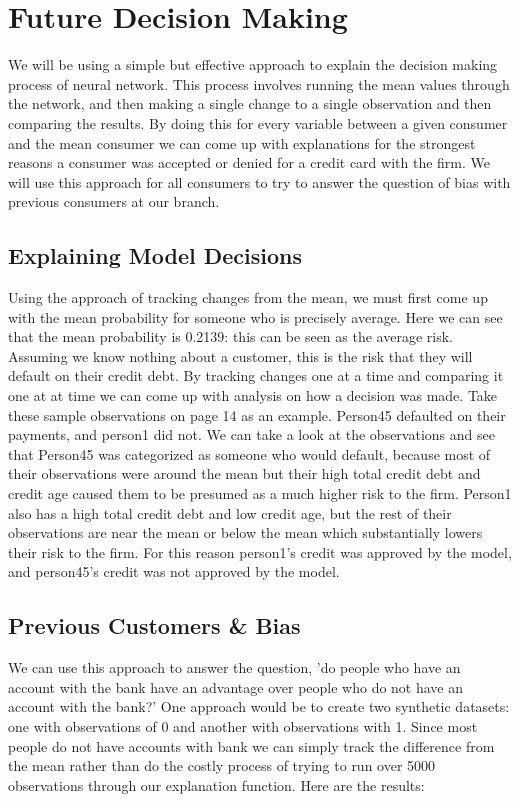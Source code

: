 \documentclass[12pt]{article}
\begin{document}
	
	\section{Future Decision Making}
	
	We will be using a simple but effective approach to explain the decision making process of neural network. This process involves running the mean values through the network, and then making a single change to a single observation and then comparing the results. By doing this for every variable between a given consumer and the mean consumer we can come up with explanations for the strongest reasons a consumer was accepted or denied for a credit card with the firm. We will use this approach for all consumers to try to answer the question of bias with previous consumers at our branch. 
	

	\subsection{Explaining Model Decisions}
	Using the approach of tracking changes from the mean, we must first come up with the mean probability for someone who is precisely average. Here we can see that the mean probability is 0.2139: this can be seen as the average risk. Assuming we know nothing about a customer, this is the risk that they will default on their credit debt. By tracking changes one at a time and comparing it one at at time we can come up with analysis on how a decision was made. Take these sample observations on page 14 as an example.
	 Person45 defaulted on their payments, and person1 did not. We can take a look at the observations and see that Person45 was categorized as someone who would default, because most of their observations were around the mean but their high total credit debt and credit age caused them to be presumed as a much higher risk to the firm. 
	 Person1 also has a high total credit debt and low credit age, but the rest of their observations are near the mean or below the mean which substantially lowers their risk to the firm. For this reason person1's credit was approved by the model, and person45's credit was not approved by the model. 
	
	
	
	\subsection{Previous Customers \& Bias}
	
	We can use this approach to answer the question, 'do people who have an account with the bank have an advantage over people who do not have an account with the bank?' One approach would be to create two synthetic datasets: one with observations of 0 and another with observations with 1. Since most people do not have accounts with bank we can simply track the difference from the mean rather than do the costly process of trying to run over 5000 observations through our explanation function. Here are the results: 
	
\end{document}
